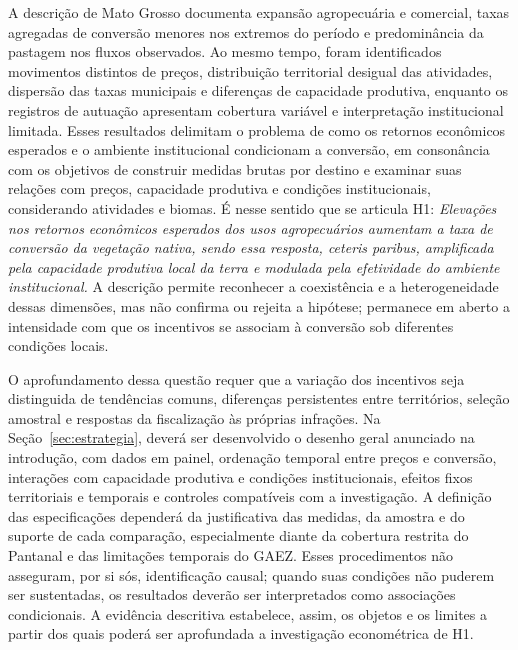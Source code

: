 A descrição de Mato Grosso documenta expansão agropecuária e comercial, taxas agregadas de conversão menores nos extremos do período e predominância da pastagem nos fluxos observados. Ao mesmo tempo, foram identificados movimentos distintos de preços, distribuição territorial desigual das atividades, dispersão das taxas municipais e diferenças de capacidade produtiva, enquanto os registros de autuação apresentam cobertura variável e interpretação institucional limitada. Esses resultados delimitam o problema de como os retornos econômicos esperados e o ambiente institucional condicionam a conversão, em consonância com os objetivos de construir medidas brutas por destino e examinar suas relações com preços, capacidade produtiva e condições institucionais, considerando atividades e biomas. É nesse sentido que se articula H1: \emph{Elevações nos retornos econômicos esperados dos usos agropecuários aumentam a taxa de conversão da vegetação nativa, sendo essa resposta, \textit{ceteris paribus}, amplificada pela capacidade produtiva local da terra e modulada pela efetividade do ambiente institucional.} A descrição permite reconhecer a coexistência e a heterogeneidade dessas dimensões, mas não confirma ou rejeita a hipótese; permanece em aberto a intensidade com que os incentivos se associam à conversão sob diferentes condições locais.

O aprofundamento dessa questão requer que a variação dos incentivos seja distinguida de tendências comuns, diferenças persistentes entre territórios, seleção amostral e respostas da fiscalização às próprias infrações. Na Seção~\ref{sec:estrategia}, deverá ser desenvolvido o desenho geral anunciado na introdução, com dados em painel, ordenação temporal entre preços e conversão, interações com capacidade produtiva e condições institucionais, efeitos fixos territoriais e temporais e controles compatíveis com a investigação. A definição das especificações dependerá da justificativa das medidas, da amostra e do suporte de cada comparação, especialmente diante da cobertura restrita do Pantanal e das limitações temporais do GAEZ. Esses procedimentos não asseguram, por si sós, identificação causal; quando suas condições não puderem ser sustentadas, os resultados deverão ser interpretados como associações condicionais. A evidência descritiva estabelece, assim, os objetos e os limites a partir dos quais poderá ser aprofundada a investigação econométrica de H1.

\endgroup
